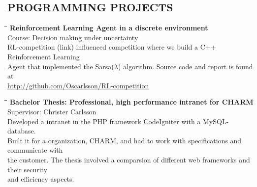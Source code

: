 \documentclass[11pt]{res}
\begin{document}
\begin{resume}
\section{PROGRAMMING PROJECTS}
\vspace{-0.1in}
	\begin{tabbing}
		\hspace{2.3in}\= \hspace{2.6in}\= \kill %
	 	{\bf Reinforcement Learning Agent in a discrete environment} \>	\\
	 	Course:  Decision making under uncertainty                    \> 	\> 2013 \\
		RL-competition (link) influenced competition where we build a C++ Reinforcement Learning \\
		Agent that implemented the Sarsa($\lambda$) algorithm. Source code and report is found at \\ 
		\url{ http://github.com/Oscarlsson/RL-competition}
	 \end{tabbing}

\vspace{-30pt}     
	\begin{tabbing}
		\hspace{2.3in}\= \hspace{2.6in}\= \kill %
	 	{\bf Bachelor Thesis: Professional, high performance intranet for CHARM} \>	\\
	 	Supervisor:  Christer Carlsson                    \> 	\> 2012 \\
		Developed a intranet in the PHP framework CodeIgniter with a MySQL-database. \\ Built it for a organization, CHARM, and had to work with specifications and communicate with \\ the customer.
		The thesis involved a comparsion of different web frameworks and their security \\ and efficiency aspects. 
	 \end{tabbing}


\end{resume}
\end{document}
